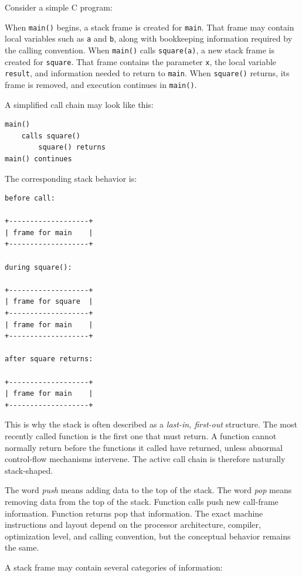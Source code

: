 Consider a simple C program:

When \texttt{main()} begins, a stack frame is created for \texttt{main}. That frame may contain local variables such as \texttt{a} and \texttt{b}, along with bookkeeping information required by the calling convention. When \texttt{main()} calls \texttt{square(a)}, a new stack frame is created for \texttt{square}. That frame contains the parameter \texttt{x}, the local variable \texttt{result}, and information needed to return to \texttt{main}. When \texttt{square()} returns, its frame is removed, and execution continues in \texttt{main()}.

A simplified call chain may look like this:

\begin{verbatim}
main()
    calls square()
        square() returns
main() continues
\end{verbatim}

The corresponding stack behavior is:

\begin{verbatim}
before call:

+-------------------+
| frame for main    |
+-------------------+

during square():

+-------------------+
| frame for square  |
+-------------------+
| frame for main    |
+-------------------+

after square returns:

+-------------------+
| frame for main    |
+-------------------+
\end{verbatim}

This is why the stack is often described as a \emph{last-in, first-out} structure. The most recently called function is the first one that must return. A function cannot normally return before the functions it called have returned, unless abnormal control-flow mechanisms intervene. The active call chain is therefore naturally stack-shaped.

The word \emph{push} means adding data to the top of the stack. The word \emph{pop} means removing data from the top of the stack. Function calls push new call-frame information. Function returns pop that information. The exact machine instructions and layout depend on the processor architecture, compiler, optimization level, and calling convention, but the conceptual behavior remains the same.

A stack frame may contain several categories of information:

